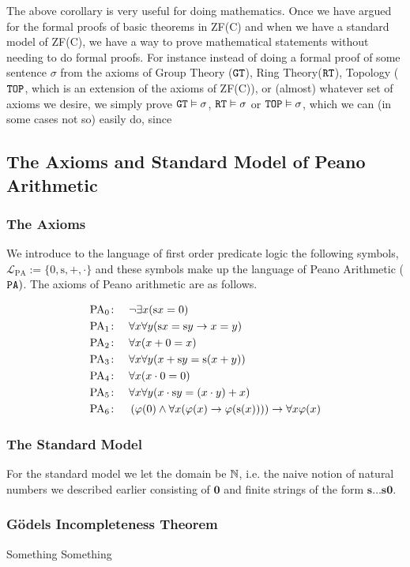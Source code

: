 The above corollary is very useful for doing mathematics. Once we have argued for the formal proofs of basic theorems in ZF(C) and when we have a standard model of ZF(C), we have a way to prove mathematical statements without needing to do formal proofs. For instance instead of doing a formal proof of some sentence $\sigma$ from the axioms of Group Theory ($\verb|GT|$), Ring Theory($\verb|RT|$), Topology ($\verb|TOP|$, which is an extension of the axioms of ZF(C)), or (almost) whatever set of axioms we desire, we simply prove $\verb|GT|\vDash \sigma$, $\verb|RT|\vDash \sigma$ or $\verb|TOP|\vDash \sigma$, which we can (in some cases not so) easily do, since  
\subsection{The Axioms and Standard Model of Peano Arithmetic}

\subsubsection{The Axioms}
We introduce to the language of first order predicate logic the following symbols, $\mathcal{L}_{\mathrm{PA}}:=\{0,\mathrm{s},+,\cdot\}$ and these symbols make up the language of Peano Arithmetic ($\verb|PA|)$. The axioms of Peano arithmetic are as follows. 
    \begin{axioms}
        \begin{align*}
            \mathrm{PA}_0\colon\quad & \neg \exists x (\mathrm{s} x = 0) \\
            \mathrm{PA}_1\colon\quad & \forall x \forall y (\mathrm{s} x = \mathrm{s} y \rightarrow x = y) \\
            \mathrm{PA}_2\colon\quad & \forall x (x + 0 = x) \\
            \mathrm{PA}_3\colon\quad & \forall x \forall y (x + \mathrm{s} y = \mathrm{s}(x + y)) \\
            \mathrm{PA}_4\colon\quad & \forall x (x \cdot 0 = 0) \\
            \mathrm{PA}_5\colon\quad & \forall x \forall y (x \cdot \mathrm{s} y = (x \cdot y) + x) \\
            \mathrm{PA}_6\colon\quad & \left( \varphi(0) \land \forall x (\varphi(x) \rightarrow \varphi(\mathrm{s} (x))) \right) \rightarrow \forall x \varphi(x)
        \end{align*}
    \end{axioms}
\subsubsection{The Standard Model}
For the standard model we let the domain be $\mathbb{N}$, i.e. the naive notion of natural numbers we described earlier consisting of $\mathbf{0}$ and finite strings of the form $\mathbf{s}\dots \mathbf{s}\mathbf{0}$. 


\subsubsection{Gödels Incompleteness Theorem}
Something Something 
